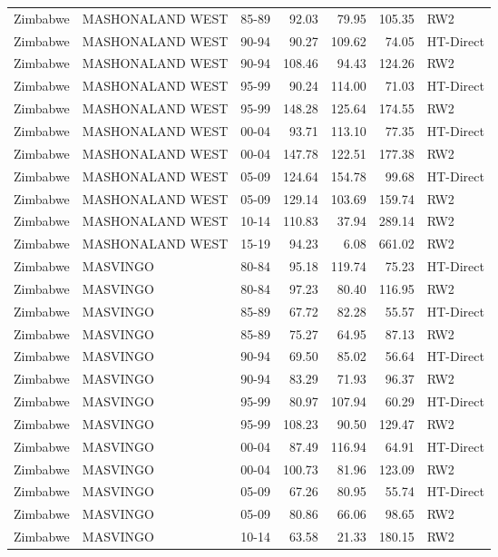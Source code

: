 \begin{longtable}{lllrrrl}
  Zimbabwe & MASHONALAND WEST & 85-89 & 92.03 & 79.95 & 105.35 & RW2 \\ 
  Zimbabwe & MASHONALAND WEST & 90-94 & 90.27 & 109.62 & 74.05 & HT-Direct \\ 
  Zimbabwe & MASHONALAND WEST & 90-94 & 108.46 & 94.43 & 124.26 & RW2 \\ 
  Zimbabwe & MASHONALAND WEST & 95-99 & 90.24 & 114.00 & 71.03 & HT-Direct \\ 
  Zimbabwe & MASHONALAND WEST & 95-99 & 148.28 & 125.64 & 174.55 & RW2 \\ 
  Zimbabwe & MASHONALAND WEST & 00-04 & 93.71 & 113.10 & 77.35 & HT-Direct \\ 
  Zimbabwe & MASHONALAND WEST & 00-04 & 147.78 & 122.51 & 177.38 & RW2 \\ 
  Zimbabwe & MASHONALAND WEST & 05-09 & 124.64 & 154.78 & 99.68 & HT-Direct \\ 
  Zimbabwe & MASHONALAND WEST & 05-09 & 129.14 & 103.69 & 159.74 & RW2 \\ 
  Zimbabwe & MASHONALAND WEST & 10-14 & 110.83 & 37.94 & 289.14 & RW2 \\ 
  Zimbabwe & MASHONALAND WEST & 15-19 & 94.23 & 6.08 & 661.02 & RW2 \\ 
  Zimbabwe & MASVINGO & 80-84 & 95.18 & 119.74 & 75.23 & HT-Direct \\ 
  Zimbabwe & MASVINGO & 80-84 & 97.23 & 80.40 & 116.95 & RW2 \\ 
  Zimbabwe & MASVINGO & 85-89 & 67.72 & 82.28 & 55.57 & HT-Direct \\ 
  Zimbabwe & MASVINGO & 85-89 & 75.27 & 64.95 & 87.13 & RW2 \\ 
  Zimbabwe & MASVINGO & 90-94 & 69.50 & 85.02 & 56.64 & HT-Direct \\ 
  Zimbabwe & MASVINGO & 90-94 & 83.29 & 71.93 & 96.37 & RW2 \\ 
  Zimbabwe & MASVINGO & 95-99 & 80.97 & 107.94 & 60.29 & HT-Direct \\ 
  Zimbabwe & MASVINGO & 95-99 & 108.23 & 90.50 & 129.47 & RW2 \\ 
  Zimbabwe & MASVINGO & 00-04 & 87.49 & 116.94 & 64.91 & HT-Direct \\ 
  Zimbabwe & MASVINGO & 00-04 & 100.73 & 81.96 & 123.09 & RW2 \\ 
  Zimbabwe & MASVINGO & 05-09 & 67.26 & 80.95 & 55.74 & HT-Direct \\ 
  Zimbabwe & MASVINGO & 05-09 & 80.86 & 66.06 & 98.65 & RW2 \\ 
  Zimbabwe & MASVINGO & 10-14 & 63.58 & 21.33 & 180.15 & RW2 \\ 

\end{longtable}
